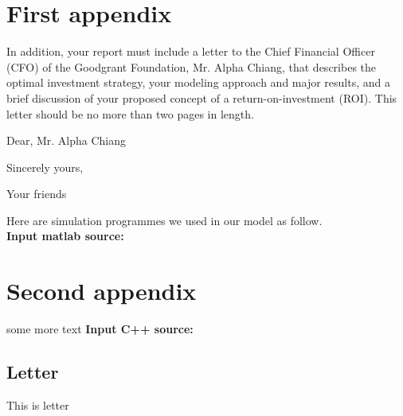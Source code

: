 \documentclass{mcmthesis}
\begin{document}
\begin{appendices}

\section{First appendix}

In addition, your report must include a letter to the Chief Financial Officer (CFO) of the Goodgrant Foundation, Mr. Alpha Chiang, that describes the optimal investment strategy, your modeling approach and major results, and a brief discussion of your proposed concept of a return-on-investment (ROI). This letter should be no more than two pages in length.

\begin{letter}{Dear, Mr. Alpha Chiang}

\lipsum[1-2]

\vspace{\parskip}

Sincerely yours,

Your friends

\end{letter}
Here are simulation programmes we used in our model as follow.\\

\textbf{\textcolor[rgb]{0.98,0.00,0.00}{Input matlab source:}}


\section{Second appendix}

some more text \textcolor[rgb]{0.98,0.00,0.00}{\textbf{Input C++ source:}}

\end{appendices}

\newpage
\begin{center}
\section*{Letter}
\end{center}
\qquad This is letter\\

\end{document}
